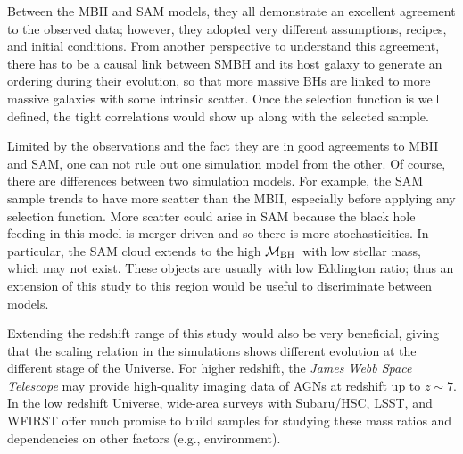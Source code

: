 \documentclass{natureprintstyle}
\newcommand{\mbh}{$\mathcal M_{\rm BH}$}
\newcommand{\lhost}{$L_{\rm host}$}
\newcommand{\mstar}{{$M_*$}}
\begin{document}
Between the MBII and SAM models, they all demonstrate an excellent agreement to the observed data; however, they adopted very different assumptions, recipes, and initial conditions. From another perspective to understand this agreement, there has to be a causal link between SMBH and its host galaxy to generate an ordering during their evolution, so that more massive BHs are linked to more massive galaxies with some intrinsic scatter. Once the selection function is well defined, the tight correlations would show up along with the selected sample.

Limited by the observations and the fact they are in good agreements to MBII and SAM, one can not rule out one simulation model from the other. Of course, there are differences between two simulation models. For example, the SAM sample trends to have more scatter than the MBII, especially before applying any selection function. More scatter could arise in SAM because the black hole feeding in this model is merger driven and so there is more stochasticities. In particular, the SAM cloud extends to the high \mbh\ with low stellar mass, which may not exist. These objects are usually with low Eddington ratio; thus an extension of this study to this region would be useful to discriminate between models.

Extending the redshift range of this study would also be very beneficial, giving that the scaling relation in the simulations shows different evolution at the different stage of the Universe. For higher redshift, the {\it James Webb Space Telescope} may provide high-quality imaging data of AGNs at redshift up to $z\sim7$. In the low redshift Universe, wide-area surveys with Subaru/HSC, LSST, and WFIRST offer much promise to build samples for studying these mass ratios and dependencies on other factors (e.g., environment).



\end{document}
